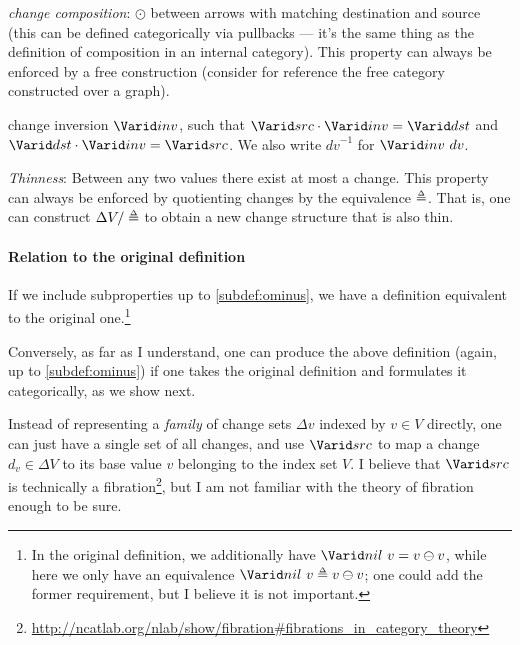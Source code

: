 \begin{definition}
\begin{subdefinition}[resume]
\item \label{subdef:composition} \emph{change composition}:
  $\odot$ between arrows with matching destination and
  source (this can be defined categorically via pullbacks --- it's the same
  thing as the definition of composition in an internal category). This property
  can always be enforced by a free construction (consider for reference the free
  category constructed over a graph).
\item \label{subdef:groupoid} change inversion $\Term{inv}$, such that
  $\Term{src} \cdot \Term{inv} = \Term{dst}$ and
  $\Term{dst} \cdot \Term{inv} = \Term{src}$. We also write ${dv}^{-1}$ for
  $\Term{inv}\ dv$.
\item \label{subdef:thin} \emph{Thinness}: Between any two values there exist at
  most a change. This property can always be enforced by quotienting changes by
  the equivalence $\Doe$. That is, one can construct $\Delta V / \Doe$ to
  obtain a new change structure that is also thin.
\end{subdefinition}
\end{definition}

\paragraph{Relation to the original definition}
If we include subproperties up to \cref{subdef:ominus}, we have a definition
equivalent to the original one.\footnote{In the original definition, we
  additionally have $\Term{nil}\ v = v \ominus v$, while here we only have an
  equivalence $\Term{nil}\ v \Doe v \ominus v$; one could add the former requirement,
  but I believe it is not important.}

Conversely, as far as I understand, one can produce the above definition (again,
up to \cref{subdef:ominus}) if one takes the original definition and
formulates it categorically, as we show next.

Instead of representing a \emph{family} of change sets $\Delta v$ indexed by
$v \in V$ directly, one can just have a single set of all changes, and use
$\Term{src}$ to map a change $d_v \in \Delta V$ to its base value $v$ belonging
to the index set $V$. I believe that $\Term{src}$ is technically a
fibration\footnote{\url{http://ncatlab.org/nlab/show/fibration\#fibrations_in_category_theory}},
but I am not familiar with the theory of fibration enough to be sure.

